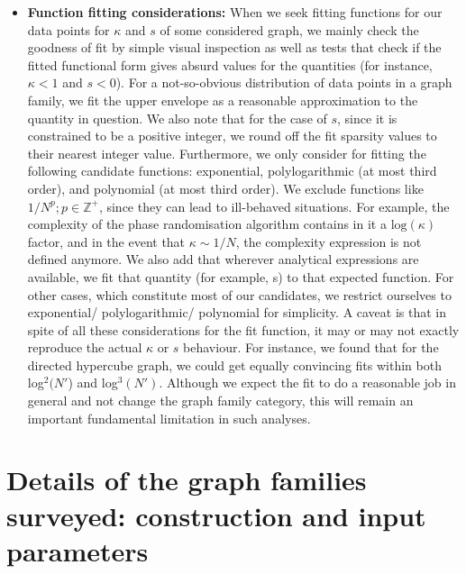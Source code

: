 \documentclass[%
 reprint,
 superscriptaddress,
 amsmath,amssymb,
 aps,
 pra,
floatfix,
nofootinbib,
]{revtex4-2}
\theoremstyle{definition}
\theoremstyle{remark}
\begin{document}
\begin{appendix}
\begin{itemize}
\item \textbf{Function fitting considerations: }When we seek fitting functions for our data points for $\kappa$ and $s$ of some considered graph, we mainly check the goodness of fit by simple visual inspection as well as tests that check if the fitted functional form gives absurd values for the quantities (for instance, $\kappa<1$ and $s<0$). For a not-so-obvious distribution of data points in a graph family, we fit the upper envelope as a reasonable approximation to the quantity in question. We also note that for the case of $s$, since it is constrained to be a positive integer, we round off the fit sparsity values to their nearest integer value. Furthermore, we only consider for fitting the following candidate functions: exponential, polylogarithmic (at most third order), and polynomial (at most third order). We exclude functions like $1/N^{p}; p \in \mathbb{Z}^{+}$, since they can lead to ill-behaved situations. For example, the complexity of the phase randomisation algorithm contains in it a $\mathrm{log}(\kappa)$ factor, and in the event that $\kappa \sim 1/N$, the complexity expression is not defined anymore. We also add that wherever analytical expressions are available, we fit that quantity (for example, s) to that expected function. For other cases, which constitute most of our candidates, we restrict ourselves to exponential/ polylogarithmic/ polynomial for simplicity. A caveat is that in spite of all these considerations for the fit function, it may or may not exactly reproduce the actual $\kappa$ or $s$ behaviour. For instance, we found that for the directed hypercube graph, we could get equally convincing fits within both log$^2(N'$) and log$^3(N')$. Although we expect the fit to do a reasonable job in general and not change the graph family category, this will remain an important fundamental limitation in such analyses. 
\end{itemize} 

\section{Details of the graph families surveyed: construction and input parameters} \label{app:params} 


\end{appendix}
\end{document}
